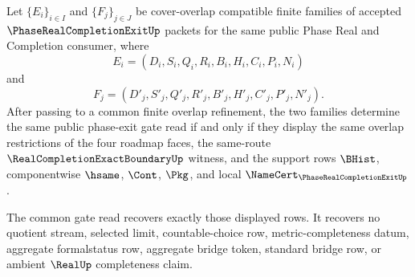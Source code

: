 \begin{theorem}
\label{thm:phase-real-completion-exit-cover-overlap-no-confusion}
Let $\{E_i\}_{i \in I}$ and $\{F_j\}_{j \in J}$ be cover-overlap compatible finite families of accepted $\PhaseRealCompletionExitUp$ packets for the same public Phase Real and Completion consumer, where
$$
E_i=(D_i,S_i,Q_i,R_i,B_i,H_i,C_i,P_i,N_i)
$$
and
$$
F_j=(D'_j,S'_j,Q'_j,R'_j,B'_j,H'_j,C'_j,P'_j,N'_j).
$$
After passing to a common finite overlap refinement, the two families determine the same public phase-exit gate read if and only if they display the same overlap restrictions of the four roadmap faces, the same-route $\RealCompletionExactBoundaryUp$ witness, and the support rows $\BHist$, componentwise $\hsame$, $\Cont$, $\Pkg$, and local $\NameCert_{\PhaseRealCompletionExitUp}$.

The common gate read recovers exactly those displayed rows. It recovers no quotient stream, selected limit, countable-choice row, metric-completeness datum, aggregate formalstatus row, aggregate bridge token, standard bridge row, or ambient $\RealUp$ completeness claim.
\end{theorem}
